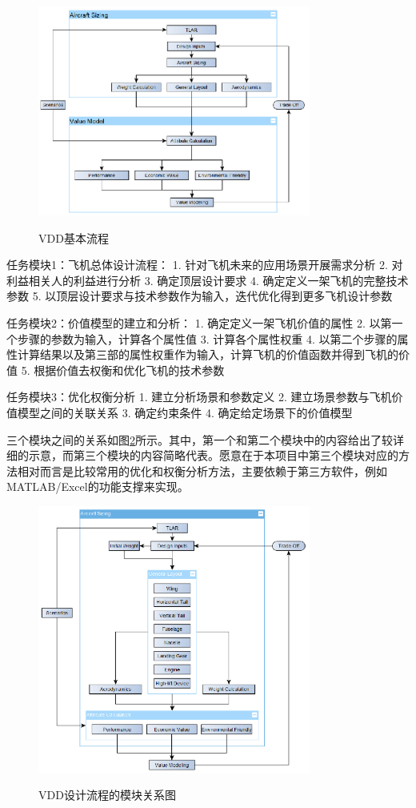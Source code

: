 \documentclass[12pt,a4paper]{report}
\begin{document}
\begin{figure}[ht!]
  \centering
  \includegraphics[width=0.8\textwidth]{vdd.eps}\\
  \caption{VDD基本流程}
  \label{fig_vdd}
\end{figure}

任务模块1：飞机总体设计流程：
1.	针对飞机未来的应用场景开展需求分析
2.	对利益相关人的利益进行分析
3.	确定顶层设计要求
4.	确定定义一架飞机的完整技术参数
5.	以顶层设计要求与技术参数作为输入，迭代优化得到更多飞机设计参数

任务模块2：价值模型的建立和分析：
1.	确定定义一架飞机价值的属性
2.	以第一个步骤的参数为输入，计算各个属性值
3.	计算各个属性权重
4.	以第二个步骤的属性计算结果以及第三部的属性权重作为输入，计算飞机的价值函数并得到飞机的价值
5.	根据价值去权衡和优化飞机的技术参数

任务模块3：优化权衡分析
1.	建立分析场景和参数定义
2.	建立场景参数与飞机价值模型之间的关联关系
3.	确定约束条件
4.	确定给定场景下的价值模型


三个模块之间的关系如图\ref{fig_vddflowchart}所示。其中，第一个和第二个模块中的内容给出了较详细的示意，而第三个模块的内容简略代表。愿意在于本项目中第三个模块对应的方法相对而言是比较常用的优化和权衡分析方法，主要依赖于第三方软件，例如MATLAB/Excel的功能支撑来实现。
\begin{figure}[ht!]
  \centering
  \includegraphics[width=0.8\textwidth]{vddflowchart.eps}\\
  \caption{VDD设计流程的模块关系图}
  \label{fig_vddflowchart}
\end{figure}
\end{document}
